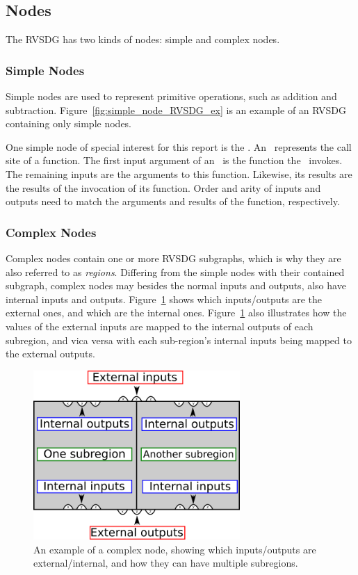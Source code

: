 \subsection{Nodes}

The RVSDG has two kinds of nodes: simple and complex nodes.

\subsubsection{Simple Nodes}

Simple nodes are used to represent primitive operations, such as addition and
subtraction. Figure~\ref{fig:simple_node_RVSDG_ex} is an example of an RVSDG
containing only simple nodes.

One simple node of special interest for this report is the \applyNode . An
\applyNode~represents the call site of a function. The first input argument of
an \applyNode~is the function the \applyNode~invokes. The remaining inputs are
the arguments to this function. Likewise, its results are the results of the
invocation of its function. Order and arity of inputs and outputs need to match
the arguments and results of the function, respectively.

\subsubsection{Complex Nodes}

Complex nodes contain one or more RVSDG subgraphs, which is why they are also
referred to as \textit{regions}. Differing from the simple nodes with their
contained subgraph, complex nodes may besides the normal inputs and outputs,
also have internal inputs and outputs. Figure~\ref{fig:complex_node_mapping_ex}
shows which inputs/outputs are the external ones, and which are the internal
ones. Figure~\ref{fig:complex_node_mapping_ex} also illustrates how the values
of the external inputs are mapped to the internal outputs of each subregion, and
vica versa with each sub-region's internal inputs being mapped to the external
outputs.

\begin{figure}[H]
	\centering
	\includegraphics[width=0.7\textwidth]{figures/svg/complex_node_mapping_ex}
	\caption{An example of a complex node, showing which inputs/outputs
are external/internal, and how they can have multiple subregions.}
	\label{fig:complex_node_mapping_ex}
\end{figure}

